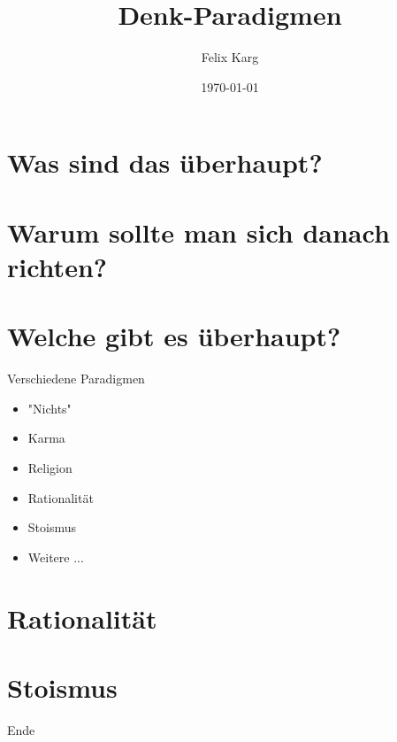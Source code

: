 \documentclass[13pt,compress,ngerman,utf8,t]{beamer}
\date{\today}
\institute{University of Freiburg}
\title{Denk-Paradigmen}
\author{Felix Karg}
\begin{document}
\maketitle



\section{Was sind das überhaupt?}


\section{Warum sollte man sich danach richten?}


\section{Welche gibt es überhaupt?}
\begin{frame}{Verschiedene Paradigmen}
    \begin{itemize}
        \item "Nichts"
        \item Karma
        \item Religion
        \item Rationalität
        \item Stoismus
        \item Weitere ...
    \end{itemize}
\end{frame}


\section{Rationalität}


\section{Stoismus}


\begin{frame}[standout]
    Ende
\end{frame}
\end{document}
